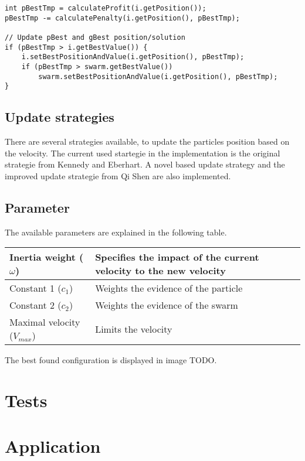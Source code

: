 \documentclass{article}
\begin{document}
\begin{lstlisting}[caption="Solver.cpp"]
int pBestTmp = calculateProfit(i.getPosition());
pBestTmp -= calculatePenalty(i.getPosition(), pBestTmp);

// Update pBest and gBest position/solution
if (pBestTmp > i.getBestValue()) {
    i.setBestPositionAndValue(i.getPosition(), pBestTmp);
	if (pBestTmp > swarm.getBestValue())
	    swarm.setBestPositionAndValue(i.getPosition(), pBestTmp);
}
\end{lstlisting}

\subsection{Update strategies}
There are several strategies available, to update the particles position based on the velocity. The current used startegie in the implementation is the original strategie from Kennedy and Eberhart. A novel based update strategy and the improved update strategie from Qi Shen are also implemented.

\subsection{Parameter}

The available parameters are explained in the following table.\\

\begin{tabular}{|l|l|}
	\hline
	Inertia weight ($\omega$) & Specifies the impact of the current velocity to the new velocity \\ \hline
	Constant 1 ($c_1$) & Weights the evidence of the particle \\ \hline
	Constant 2 ($c_2$) & Weights the evidence of the swarm \\ \hline
	Maximal velocity ($V_{max}$) & Limits the velocity \\ \hline
\end{tabular}

The best found configuration is displayed in image TODO.

\section{Tests}
\label{lbl-tests}

\section{Application}
\label{lbl-app}
\end{document}
